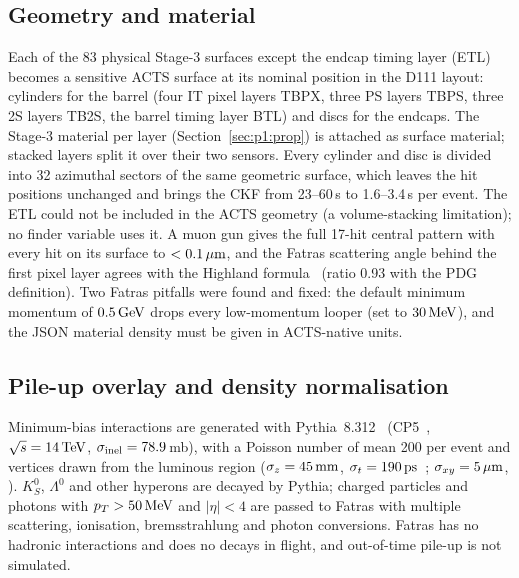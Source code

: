 \subsection{Geometry and material}\label{sec:detector:geo}
Each of the 83 physical Stage-3 surfaces except the endcap timing layer (ETL) becomes a sensitive ACTS surface at its nominal position in the D111 layout:
cylinders for the barrel (four IT pixel layers TBPX, three PS layers TBPS, three 2S layers TB2S, the barrel timing layer
BTL) and discs for the endcaps. The Stage-3 material per layer (Section~\ref{sec:p1:prop}) is attached as surface
material; stacked layers split it over their two sensors. Every cylinder and disc is divided into 32 azimuthal sectors of
the same geometric surface, which leaves the hit positions unchanged and brings the CKF from 23--60\,s to 1.6--3.4\,s per event. The
ETL could not be included in the ACTS geometry (a volume-stacking limitation); no finder variable uses it. A muon gun gives the full
17-hit central pattern with every hit on its surface to $<0.1\,\mu\mathrm{m}$, and the Fatras scattering angle behind the first pixel
layer agrees with the Highland formula~\cite{Highland:1975pq} (ratio 0.93 with the PDG definition). Two Fatras pitfalls
were found and fixed: the default minimum momentum of $0.5\,\mathrm{GeV}$ drops every low-momentum looper (set to $30\,\mathrm{MeV}$), and
the JSON material density must be given in ACTS-native units.

\subsection{Pile-up overlay and density normalisation}\label{sec:detector:pu}
Minimum-bias interactions are generated with Pythia~8.312~\cite{Bierlich:2022pfr} (CP5~\cite{CMS:2019csb},
$\sqrt s=14\,\mathrm{TeV}$, $\sigma_{\rm inel}=78.9$\,mb), with a Poisson number of mean 200 per event and vertices drawn from the
luminous region ($\sigma_z=45\,\mathrm{mm}$, $\sigma_t=190\,\mathrm{ps}$~\cite{Butler:2019rpu}; $\sigma_{xy}=5\,\mu\mathrm{m}$, \EST{}).
$K^0_S$, $\Lambda^0$ and other hyperons are decayed by Pythia; charged particles and photons with $p_T>50\,\mathrm{MeV}$ and $|\eta|<4$
are passed to Fatras with multiple scattering, ionisation, bremsstrahlung and photon conversions. Fatras has no hadronic
interactions and does no decays in flight, and out-of-time pile-up is not simulated.

